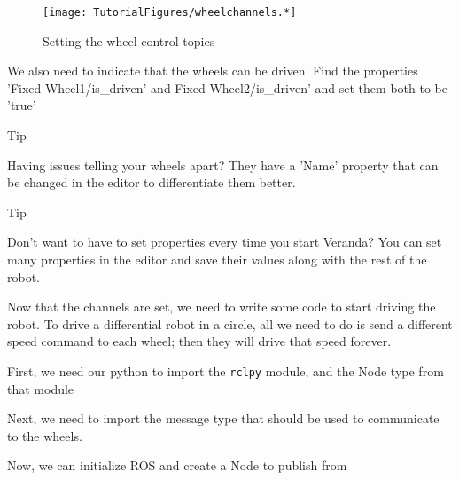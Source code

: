 \begin{figure}
\centering
\texttt{[image: TutorialFigures/wheelchannels.*]}
\caption{Setting the wheel control topics}
\end{figure}

We also need to indicate that the wheels can be driven. Find the
properties 'Fixed Wheel1/is\_driven' and Fixed Wheel2/is\_driven' and
set them both to be 'true'

Tip

Having issues telling your wheels apart? They have a 'Name' property
that can be changed in the editor to differentiate them better.

Tip

Don't want to have to set properties every time you start Veranda? You
can set many properties in the editor and save their values along with
the rest of the robot.

Now that the channels are set, we need to write some code to start
driving the robot. To drive a differential robot in a circle, all we
need to do is send a different speed command to each wheel; then they
will drive that speed forever.

First, we need our python to import the \texttt{rclpy} module, and the
Node type from that module

\begin{Shaded}
\begin{Highlighting}[]
\end{Highlighting}
\end{Shaded}

Next, we need to import the message type that should be used to
communicate to the wheels.

\begin{Shaded}
\begin{Highlighting}[]
\end{Highlighting}
\end{Shaded}

Now, we can initialize ROS and create a Node to publish from

\begin{Shaded}
\begin{Highlighting}[]
\OperatorTok{=}\NormalTok{)}
\end{Highlighting}
\end{Shaded}

